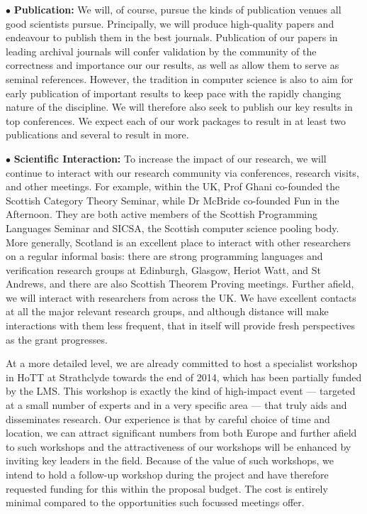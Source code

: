 \documentclass[a4paper,11pt]{article}
\begin{document}
\vspace*{0.02in}

$\bullet$ {\bf Publication:} We will, of course, pursue the kinds of
publication venues all good scientists pursue. Principally, we will
produce high-quality papers and endeavour to publish them in the best
journals. Publication of our papers in leading archival journals will
confer validation by the community of the correctness and importance
our our results, as well as allow them to serve as seminal references.
However, the tradition in computer science is also to aim for early
publication of important results to keep pace with the rapidly
changing nature of the discipline. We will therefore also seek to
publish our key results in top conferences. We expect each of our work
packages to result in at least two publications and several to result
in more.

\vspace*{0.02in} $\bullet$ {\bf Scientific
  Interaction:} %
To increase the impact of our research, we will continue to interact
with our research community via %
conferences, research visits, and other meetings. For example, within the UK, Prof
Ghani co-founded the Scottish Category Theory Seminar, while Dr McBride
co-founded Fun in the Afternoon. They are both active members of the
Scottish Programming Languages Seminar and SICSA, the Scottish computer science pooling
body. More generally, Scotland is an excellent place to interact with
other researchers on a regular informal basis: there
are %
strong programming languages and verification research groups at Edinburgh, Glasgow,
Heriot Watt, and St Andrews, and there are also Scottish Theorem
Proving meetings. Further afield, we will interact with researchers
from across the UK. We have excellent contacts at all the major
relevant research groups, and although distance will make interactions
with them less frequent, that in itself will provide fresh
perspectives as the grant progresses. 

At a more detailed level, we are already committed to host a
specialist workshop in HoTT at Strathclyde towards the end of 2014,
which has been partially funded by the LMS. This workshop is exactly
the kind of high-impact event --- targeted at a small number of
experts and in a very specific area --- that truly aids and
disseminates research. Our experience is that by careful choice of
time and location, we can attract significant numbers from both Europe
and further afield to such workshops and the attractiveness of our
workshops will be enhanced by inviting key leaders in the
field. Because of the value of such workshops, we intend to hold a
follow-up workshop during the project and have therefore requested
funding for this within the proposal budget.  The cost is entirely
minimal compared to the opportunities such focussed meetings offer.
\end{document}
